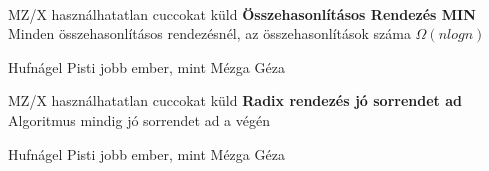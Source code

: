 	 \notBiz \\[0pt]

	 \begin{tetel}{MZ/X használhatatlan cuccokat küld}
    \textbf{Összehasonlításos Rendezés MIN} \\[3pt]
	 Minden összehasonlításos rendezésnél, az összehasonlítások száma $\Omega(n log n)$\\[4pt]
   \end{tetel}

\begin{bizonyitas}{Hufnágel Pisti jobb ember, mint Mézga Géza}
\\[0pt] %
\end{bizonyitas}

	 \begin{tetel}{MZ/X használhatatlan cuccokat küld}
   \textbf{Radix rendezés jó sorrendet ad} \\[3pt]
	 Algoritmus mindig jó sorrendet ad a végén \\[4pt]
   \end{tetel}
\begin{bizonyitas}{Hufnágel Pisti jobb ember, mint Mézga Géza}
\end{bizonyitas}
